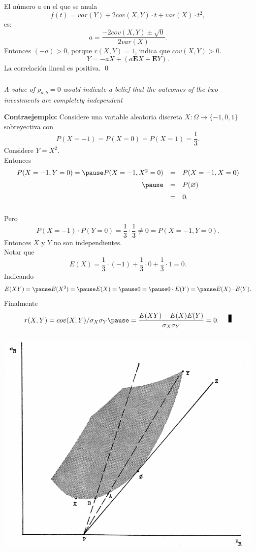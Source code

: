\documentclass{beamer}
\begin{document}
\begin{frame}[t,fragile]
	\frametitle{\subsecname}
	El número \(a\) en el que se anula 
	\[
  f(t) =var(Y)+2cov(X,Y)\cdot t+var(X)\cdot t^2,
	\]
	es:
	\[
		a = \dfrac{-2 cov(X,Y) \pm \sqrt{0}}{2 var(X)}.
	\]
	Entonces \((-a) >0\), porque \(r(X,Y) =1\), indica que \(cov(X,Y) >0\).
	$$Y=-aX+(a \mathbf{E}X+ \mathbf{E}Y).$$
	La correlación lineal es positiva. \qed
\end{frame}

\begin{frame}[t,fragile]
	\frametitle{\subsecname}
	\begin{block}{\centering}
		\textit{
			A value of \(\rho _{a,b} = 0\) would
indicate a belief that the outcomes of the two investments are completely
independent}
	\end{block}
	\pause
	\textbf{Contraejemplo:} Considere una variable aleatoria discreta
	\(X : \Omega \longrightarrow \{-1,0,1\}\) sobreyectiva con
	\[
		P(X=-1) = P(X =0) = P(X = 1) = \dfrac{1}{3}.
	\]
	Considere \(Y = X ^ 2\). \\ 
	\pause
	Entonces
	\[
		\begin{array}{rcl}
		P(X = -1 , Y = 0) = \pause
			P(X = -1, X ^ 2 =0) & = &
			P(X = -1, X = 0) \\[2mm] 
		\pause
			& = & P(\varnothing) \\[2mm] 
			& = & 0.
		\end{array}
	\]
\end{frame}

\begin{frame}[t,fragile]
	\frametitle{\subsecname}
	Pero
	\[
		P(X=-1) \cdot P(Y =0) = \dfrac{1}{3} \cdot \dfrac{1}{3} \ne 
		0 = P(X=-1,Y=0).
	\]
	\pause
	Entonces \(X\) y \(Y\) no son independientes. \\[2mm]
	\pause
	Notar que
	\[
		E(X) = \dfrac{1}{3} \cdot (-1) + \dfrac{1}{3} \cdot 0 
		+ \dfrac{1}{3} \cdot 1 = 0.
	\]
	\pause
	Indicando 
	\[
		E(XY) = \pause
		E(X ^ 3) = \pause
		E(X) = \pause
		0 = \pause
		0 \cdot E(Y) = \pause
		E(X) \cdot E(Y).
	\]
	Finalmente
	\[
		r(X,Y) = cov(X,Y) / \sigma _X \sigma _Y
		\pause
		= \dfrac{E(XY) - E(X) E(Y)}{\sigma _X \sigma _Y} = 0. \qed
	\]
\end{frame}

\begin{frame}[t,fragile]
	\frametitle{\subsecname}
	\includegraphics[width= 0.75 \linewidth, page = 1]{IMAGES/1/4}
\end{frame}
\end{document}

